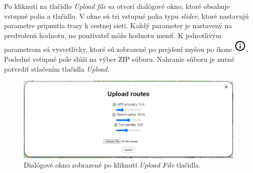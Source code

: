 Po kliknutí na tlačidlo \textit{Upload file} sa otvorí dialógové okno, ktoré obsahuje vstupné polia a tlačidlo. V okne sú tri vstupné polia typu \textit{slider}, ktoré nastavujú parametre pripnutia trasy k cestnej sieti. Každý parameter je nastavený na predvolenú hodnotu, no používateľ môže hodnotu meniť. K jednotlivým parametrom sú vysvetlivky, ktoré sú zobrazené po prejdení myšou po ikone \includegraphics[scale=0.5]{img/icons/info.png}. Posledné vstupné pole slúži na výber ZIP súboru. Nahranie súboru je nutné potvrdiť stlačením tlačidla \textit{Upload}.
\begin{figure}[H]
  \centering
  \includegraphics[width=1 \textwidth]{img/tools-panel/upload-dialog.png}
  \caption{Dialógové okno zobrazené po kliknutí \textit{Upload File} tlačidla.}
\end{figure}

